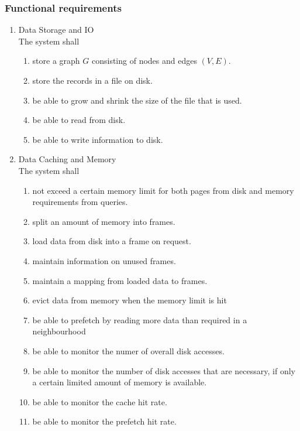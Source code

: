 	\subsubsection{Functional requirements}
\begin{enumerate}[label*=\arabic*]
\item Data Storage and IO \\
    The system shall
	\begin{enumerate}[label*=\arabic*]
	\item store a graph $G$ consisting of nodes and edges $(V, E)$.
	\item store the records in a file on disk.
    \item be able to grow and shrink the size of the file that is used.
    \item be able to read from disk.
    \item be able to write information to disk.
	\end{enumerate}
	
\item Data Caching and Memory  \\
    The system shall
	\begin{enumerate}[label*=\arabic*]
	\item not exceed a certain memory limit for both pages from disk and memory requirements from queries.
	\item split an amount of memory into frames.
	\item load data from disk into a frame on request.
	\item maintain information on unused frames.
	\item maintain a mapping from loaded data to frames.
	\item evict data from memory when the memory limit is hit
	\item be able to prefetch by reading more data than required in a neighbourhood
    \item be able to monitor the numer of overall disk accesses.
	\item be able to monitor the number of disk accesses that are necessary, if only a certain limited amount of memory is available.
	\item be able to monitor the cache hit rate.
	\item be able to monitor the prefetch hit rate.
	\end{enumerate}


\end{enumerate}
